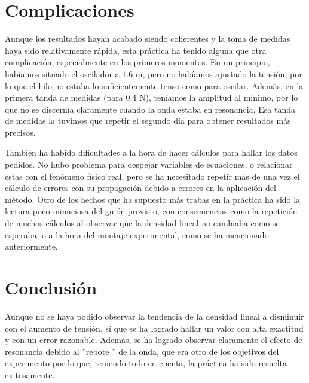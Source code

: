 \documentclass[fleqn,usenatbib,openbib]{mnras}
\begin{document}
\section{Complicaciones}

Aunque los resultados hayan acabado siendo coherentes y la toma de medidas haya sido relativamente rápida, esta práctica ha tenido alguna que otra complicación, especialmente en los primeros momentos. En un principio, habíamos situado el oscilador a $1.6$ m, pero no habíamos ajustado la tensión, por lo que el hilo no estaba lo suficientemente tenso como para oscilar. Además, en la primera tanda de medidas (para 0.4 N), teníamos la amplitud al mínimo, por lo que no se discernía claramente cuando la onda estaba en resonancia. Esa tanda de medidas la tuvimos que repetir el segundo día para obtener resultados más precisos.

También ha habido dificultades a la hora de hacer cálculos para hallar los datos pedidos. No hubo problema para despejar variables de ecuaciones, o relacionar estas con el fenómeno físico real, pero se ha necesitado repetir más de una vez el cálculo de errores con su propagación debido a errores en la aplicación del método. Otro de los hechos que ha supuesto más trabas en la práctica ha sido la lectura poco minuciosa del guión provisto, con consecuencias como la repetición de muchos cálculos al observar que la densidad lineal no cambiaba como se esperaba, o a la hora del montaje experimental, como se ha mencionado anteriormente.

\section{Conclusión}

Aunque no se haya podido observar la tendencia de la densidad lineal a disminuir con el aumento de tensión, sí que se ha logrado hallar un valor con alta exactitud y con un error razonable. Además, se ha logrado observar claramente el efecto de resonancia debido al ''rebote '' de la onda, que era otro de los objetivos del experimento por lo que, teniendo todo en cuenta, la práctica ha sido resuelta exitosamente.



\nocite{hund}


\end{document}

